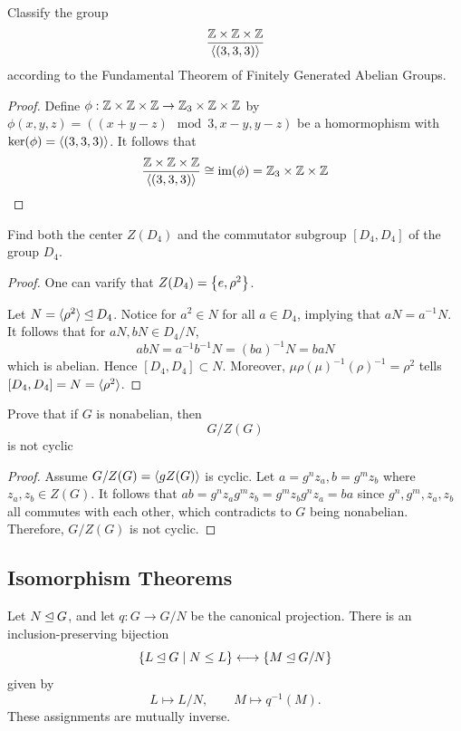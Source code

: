 \documentclass[12pt,a4paper]{article}
\begin{document}
    \begin{ex}
        Classify the group
        \[
            \frac{\mathbb{Z}\times\mathbb{Z}\times\mathbb{Z}}{\langle (3,3,3) \rangle}
        \]
        according to the Fundamental Theorem of Finitely Generated Abelian Groups.
    \end{ex}
    \begin{proof}
        Define $\phi:\mathbb{Z}\times\mathbb{Z}\times\mathbb{Z}\to\mathbb{Z}_3\times\mathbb{Z}\times\mathbb{Z}$ by $\phi(x,y,z)=((x+y-z)\mod 3,x-y,y-z)$ be a homormophism with $\ker(\phi)=\langle (3,3,3) \rangle$. It follows that 
        \[
            \frac{\mathbb{Z}\times\mathbb{Z}\times\mathbb{Z}}{\langle (3,3,3) \rangle}\cong\operatorname{im}(\phi)=\mathbb{Z}_3\times\mathbb{Z}\times\mathbb{Z}
        \]
    \end{proof}
    \bigskip

    \begin{ex}
        Find both the center $Z(D_4)$ and the commutator subgroup $[D_4,D_4]$ of the group $D_4$.
    \end{ex}
    \begin{proof}
        One can varify that $Z(D_4)=\left\{ e,\rho^2 \right\}$.
        
        Let $N=\langle \rho^2 \rangle\unlhd D_4$. Notice for $a^2\in N$ for all $a\in D_4$, implying that $aN=a^{-1}N$. It follows that for $aN,bN\in D_4/N$,
        \[
            abN=a^{-1}b^{-1}N=(ba)^{-1}N=baN
        \]
        which is abelian. Hence $[D_4,D_4]\subset N$. Moreover, $\mu\rho(\mu)^{-1}(\rho)^{-1}=\rho^2$ tells $[D_4,D_4]=N=\langle \rho^2 \rangle$.
    \end{proof}
    \bigskip

    \begin{ex}
        Prove that if $G$ is nonabelian, then
        \[
            G/Z(G)
        \]
        is not cyclic
    \end{ex}
    \begin{proof}
        Assume $G/Z(G)=\langle gZ(G) \rangle$ is cyclic. Let $a=g^nz_a,b=g^mz_b$ where $z_a,z_b\in Z(G)$. It follows that $ab=g^nz_ag^mz_b=g^mz_bg^nz_a=ba$ since $g^n,g^m,z_a,z_b$ all commutes with each other, which contradicts to $G$ being nonabelian. Therefore, $G/Z(G)$ is not cyclic.
    \end{proof}
    \bigskip
    
    \subsection{Isomorphism Theorems}
    
    
    \begin{lemma}
        Let $N \unlhd G$, and let $q \colon G \to G/N$ be the
        canonical projection. There is an inclusion-preserving bijection
        \[
            \left\{ L \unlhd G \mid N \le L \right\}
            \longleftrightarrow
            \left\{ M \unlhd G/N \right\}
        \]
        given by
        \[
            L \longmapsto L/N,
            \qquad
            M \longmapsto q^{-1}(M).
        \]
        These assignments are mutually inverse.
    \end{lemma}
    \bigskip
    
\end{document}
